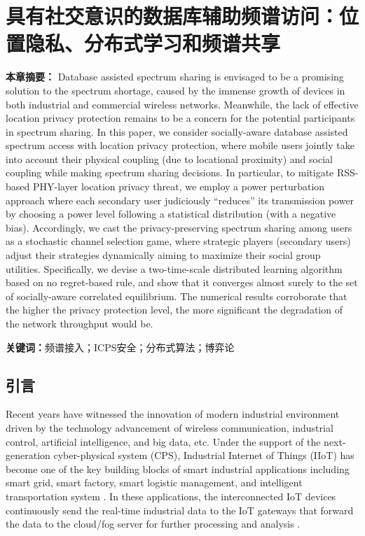 \chapter{具有社交意识的数据库辅助频谱访问：位置隐私、分布式学习和频谱共享}

\textbf{本章摘要：} 
Database assisted spectrum sharing is envisaged to be a promising solution to the spectrum shortage, caused by the immense growth of devices in both industrial and commercial wireless networks. Meanwhile, the lack of effective location privacy protection remains to be a concern for the potential participants in spectrum sharing. In this paper, we consider socially-aware database assisted spectrum access with location privacy protection, where mobile users jointly take into account their physical coupling (due to locational proximity) and social coupling while making spectrum sharing decisions. In particular, to mitigate RSS-based PHY-layer location privacy threat, we employ a power perturbation approach where each secondary user judiciously ``reduces'' its transmission power by choosing a power level following a statistical distribution (with a negative bias). Accordingly, we cast the privacy-preserving spectrum sharing among users as a stochastic channel selection game, where strategic players (secondary users) adjust their strategies dynamically aiming to maximize their social group utilities. Specifically, we devise a two-time-scale distributed learning algorithm based on no regret-based rule, and show that it converges almost surely to the set of socially-aware correlated equilibrium. The numerical results corroborate that the higher the privacy protection level, the more significant the degradation of the network throughput would be.

\textbf{关键词：}频谱接入；ICPS安全；分布式算法；博弈论

\section{引言}

Recent years have witnessed the innovation of modern industrial environment driven by the technology advancement of wireless communication, industrial control, artificial intelligence, and big data, etc. Under the support of the next-generation cyber-physical system (CPS)\cite{CPSIndustry4}, Industrial Internet of Things (IIoT) has become one of the key building blocks of smart industrial applications including smart grid, smart factory, smart logistic management, and intelligent transportation system \cite{IIOTsurvey}. In these applications, the interconnected IoT devices continuously send the real-time industrial data to the IoT gateways that forward the data to the cloud/fog server for  further processing and analysis \cite{cloudfog}.

